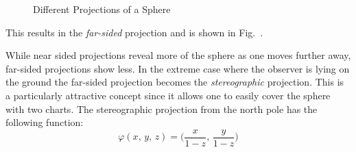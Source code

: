         \begin{figure}
            \centering
            \captionsetup{type=figure}
            \begin{subfigure}[b]{0.49\textwidth}
                \centering
                \captionsetup{type=figure}
                \label{fig:Near_Sided_Proj}
            \end{subfigure}
            \begin{subfigure}[b]{0.49\textwidth}
                \centering
                \captionsetup{type=figure}
                \label{fig:Far_Sided_Proj}
            \end{subfigure}
            \caption{Different Projections of a Sphere}
        \end{figure}
        This results in the \textit{far-sided} projection and is shown
        in Fig.~.
        \par\vspace{1ex}
        \begin{minipage}[t]{0.52\textwidth}
            While near sided projections reveal more of the sphere as
            one moves further away, far-sided projections show less. In
            the extreme case where the observer is lying on the ground
            the far-sided projection becomes the \textit{stereographic}
            projection. This is a particularly attractive concept since
            it allows one to easily cover the sphere with two charts.
            The stereographic projection from the north pole has the
            following function:
            \begin{equation}
                \varphi(x,\,y,\,z)=\Big(\frac{x}{1-z},\,\frac{y}{1-z}\Big)
            \end{equation}
        \end{minipage}
        \hfill
